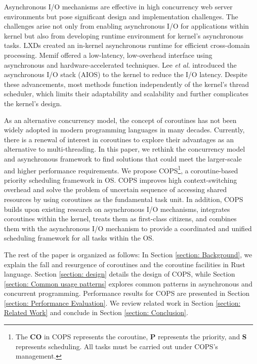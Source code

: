 \documentclass[conference]{IEEEtran}
\begin{document}
Asynchronous I/O mechanisms are effective in high concurrency web server environments but pose significant design and implementation challenges. The challenges arise not only from enabling asynchronous I/O for applications within kernel but also from developing runtime environment for kernel's asynchronous tasks. LXDs \cite{narayanan2019lxds} created an in-kernel asynchronous runtime for efficient cross-domain processing. Memif \cite{lin2016memif} offered a low-latency, low-overhead interface using asynchronous and hardware-accelerated techniques. Lee \textit{et al.} \cite{lee2019asynchronous} introduced the asynchronous I/O stack (AIOS) to the kernel to reduce the I/O latency. Despite these advancements, most methods function independently of the kernel's thread scheduler, which limits their adaptability and scalability and further complicates the kernel's design.

As an alternative concurrency model, the concept of coroutines has not been widely adopted in modern programming languages in many decades. Currently, there is a renewal of interest in coroutines to explore their advantages as an alternative to multi-threading. In this paper, we rethink the concurrency model and asynchronous framework to find solutions that could meet the larger-scale and higher performance requirements. We propose COPS\footnote{The \textbf{CO} in COPS represents the coroutine, \textbf{P} represents the priority, and \textbf{S} represents scheduling. All tasks must be carried out under COPS's management.}, a coroutine-based priority scheduling framework in OS. COPS improves high context-switching overhead and solve the problem of uncertain sequence of accessing shared resources by using coroutines as the fundamental task unit. In addition, COPS builds upon existing research on asynchronous I/O mechanisms, integrates coroutines within the kernel, treats them as first-class citizens, and combines them with the asynchronous I/O mechanism to provide a coordinated and unified scheduling framework for all tasks within the OS.

The rest of the paper is organized as follows: In Section \ref{section: Background}, we explain the fall and resurgence of coroutines and the coroutine facilities in Rust language. Section \ref{section: design} details the design of COPS, while Section \ref{section: Common usage patterns} explores common patterns in asynchronous and concurrent programming. Performance results for COPS are presented in Section \ref{section: Performance Evaluation}. We review related work in Section \ref{section: Related Work} and conclude in Section \ref{section: Conclusion}.
\end{document}
